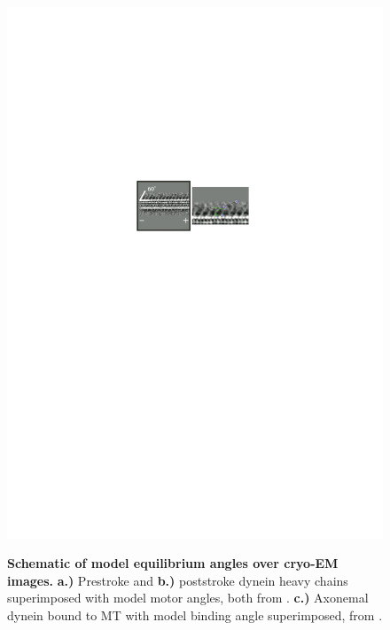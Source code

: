 \documentclass{article}
\begin{document}
\begin{figure}
\begin{minipage}{\textwidth}
   \includegraphics[width=\linewidth]{figures/schematic-binding-angle}
   \label{fig:bindingangle}
 \end{minipage}
\caption{\textbf{Schematic of model equilibrium angles over cryo-EM images.} \textbf{a.)} Prestroke and \textbf{b.)} poststroke dynein heavy chains superimposed with model motor angles, both from \cite{burgess-paper}. \textbf{c.)} Axonemal dynein bound to MT with model binding angle superimposed, from \cite{leschziner}.}
\label{fig:modelangles}
\end{figure}
\end{document}
